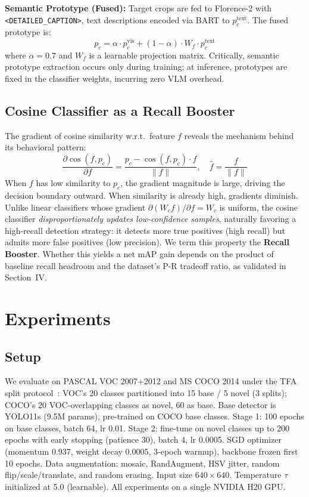 \documentclass[conference]{IEEEtran}
\begin{document}
\textbf{Semantic Prototype (Fused):} Target crops are fed to Florence-2 with \texttt{<DETAILED\_CAPTION>}, text descriptions encoded via BART to $p_c^{\text{text}}$. The fused prototype is:
\begin{equation}
p_c = \alpha \cdot p_c^{\text{vis}} + (1 - \alpha) \cdot W_f \cdot p_c^{\text{text}}
\label{eq:fused}
\end{equation}
where $\alpha=0.7$ and $W_f$ is a learnable projection matrix. Critically, semantic prototype extraction occurs only during training; at inference, prototypes are fixed in the classifier weights, incurring zero VLM overhead.

\subsection{Cosine Classifier as a Recall Booster}

The gradient of cosine similarity w.r.t.\ feature $f$ reveals the mechanism behind its behavioral pattern:
\begin{equation}
\frac{\partial \cos(f, p_c)}{\partial f} = \frac{p_c - \cos(f, p_c) \cdot \hat{f}}{\|f\|}, \quad \hat{f} = \frac{f}{\|f\|}
\label{eq:gradient}
\end{equation}
When $f$ has low similarity to $p_c$, the gradient magnitude is large, driving the decision boundary outward. When similarity is already high, gradients diminish. Unlike linear classifiers whose gradient $\partial(W_c f)/\partial f = W_c$ is uniform, the cosine classifier \textit{disproportionately updates low-confidence samples}, naturally favoring a high-recall detection strategy: it detects more true positives (high recall) but admits more false positives (low precision). We term this property the \textbf{Recall Booster}. Whether this yields a net mAP gain depends on the product of baseline recall headroom and the dataset's P-R tradeoff ratio, as validated in Section~IV.

\section{Experiments}

\subsection{Setup}

We evaluate on PASCAL VOC 2007+2012 and MS COCO 2014 under the TFA split protocol~\cite{wang2020tfa}: VOC's 20 classes partitioned into 15 base / 5 novel (3 splits); COCO's 20 VOC-overlapping classes as novel, 60 as base. Base detector is YOLO11s (9.5M params), pre-trained on COCO base classes. Stage 1: 100 epochs on base classes, batch 64, lr 0.01. Stage 2: fine-tune on novel classes up to 200 epochs with early stopping (patience 30), batch 4, lr 0.0005. SGD optimizer (momentum 0.937, weight decay 0.0005, 3-epoch warmup), backbone frozen first 10 epochs. Data augmentation: mosaic, RandAugment, HSV jitter, random flip/scale/translate, and random erasing. Input size $640\times640$. Temperature $\tau$ initialized at 5.0 (learnable). All experiments on a single NVIDIA H20 GPU.
\end{document}
